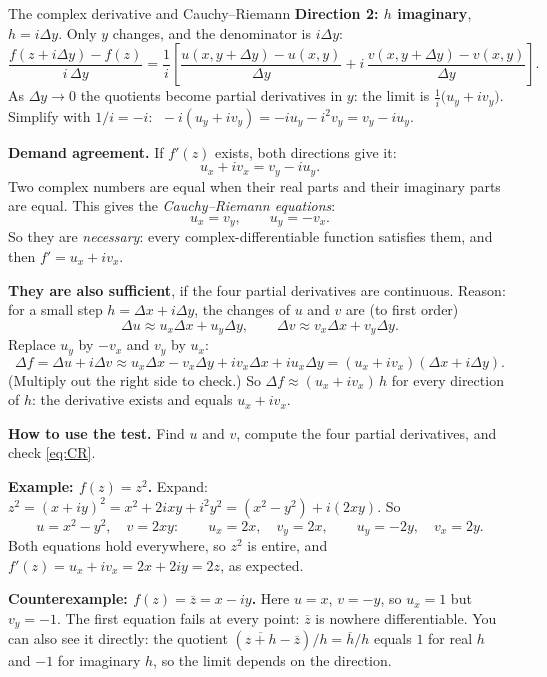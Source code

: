 \documentclass[11pt]{beamer}
\begin{document}
\begin{frame}[allowframebreaks=1.00]{The complex derivative and Cauchy--Riemann}
\textbf{Direction 2: \(h\) imaginary}, \(h=i\Delta y\). Only \(y\) changes, and the denominator is
\(i\Delta y\):
\[
 \frac{f(z+i\Delta y)-f(z)}{i\,\Delta y}
 =\frac1i\left[\frac{u(x,y+\Delta y)-u(x,y)}{\Delta y}
   +i\,\frac{v(x,y+\Delta y)-v(x,y)}{\Delta y}\right].
\]
As \(\Delta y\to0\) the quotients become partial derivatives in \(y\): the limit is
\(\frac1i\bigl(u_y+iv_y\bigr)\).
Simplify with \(1/i=-i\): \(\;-i(u_y+iv_y)=-iu_y-i^2v_y=v_y-iu_y\).
\par\framebreak\par
\textbf{Demand agreement.} If \(f'(z)\) exists, both directions give it:
\[
 u_x+iv_x=v_y-iu_y .
\]
Two complex numbers are equal when their real parts and their imaginary parts are equal. This
gives the \emph{Cauchy--Riemann equations}:
\begin{equation}
  u_x=v_y,\qquad u_y=-v_x.
  \label{eq:CR}
\end{equation}
So they are \emph{necessary}: every complex-differentiable function satisfies them, and then
\(f'=u_x+iv_x\).

\textbf{They are also sufficient}, if the four partial derivatives are continuous. Reason: for a
small step \(h=\Delta x+i\Delta y\), the changes of \(u\) and \(v\) are (to first order)
\[
 \Delta u\approx u_x\Delta x+u_y\Delta y,\qquad \Delta v\approx v_x\Delta x+v_y\Delta y .
\]
Replace \(u_y\) by \(-v_x\) and \(v_y\) by \(u_x\):
\[
 \Delta f=\Delta u+i\Delta v\approx u_x\Delta x-v_x\Delta y+iv_x\Delta x+iu_x\Delta y
 =(u_x+iv_x)(\Delta x+i\Delta y).
\]
(Multiply out the right side to check.) So \(\Delta f\approx(u_x+iv_x)\,h\) for every direction of
\(h\): the derivative exists and equals \(u_x+iv_x\).
\par\framebreak\par
\textbf{How to use the test.} Find \(u\) and \(v\), compute the four partial derivatives, and check
\eqref{eq:CR}.

\textbf{Example: \(f(z)=z^2\).} Expand: \(z^2=(x+iy)^2=x^2+2ixy+i^2y^2=(x^2-y^2)+i(2xy)\). So
\[
 u=x^2-y^2,\quad v=2xy:\qquad
 u_x=2x,\quad v_y=2x,\qquad u_y=-2y,\quad v_x=2y .
\]
Both equations hold everywhere, so \(z^2\) is entire, and
\(f'(z)=u_x+iv_x=2x+2iy=2z\), as expected.

\textbf{Counterexample: \(f(z)=\overline z=x-iy\).} Here \(u=x\), \(v=-y\), so \(u_x=1\) but
\(v_y=-1\). The first equation fails at every point: \(\overline z\) is nowhere differentiable. You can
also see it directly: the quotient \((\overline{z+h}-\overline z)/h=\overline h/h\) equals \(1\) for real \(h\)
and \(-1\) for imaginary \(h\), so the limit depends on the direction.
\end{frame}
\end{document}
